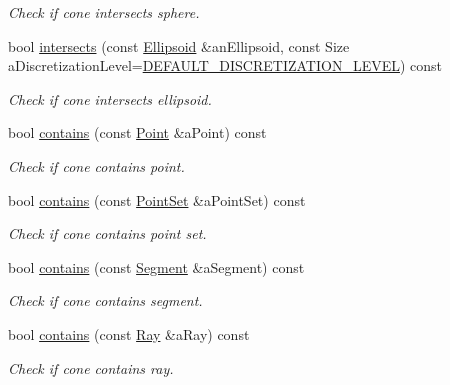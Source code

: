\begin{DoxyCompactItemize}
\begin{DoxyCompactList}\small\item\em Check if cone intersects sphere. \end{DoxyCompactList}\item 
bool \hyperlink{classostk_1_1math_1_1geom_1_1d3_1_1objects_1_1_cone_a18180f9cf2ee2ec6ef37b478c16a55b4}{intersects} (const \hyperlink{classostk_1_1math_1_1geom_1_1d3_1_1objects_1_1_ellipsoid}{Ellipsoid} \&an\+Ellipsoid, const Size a\+Discretization\+Level=\hyperlink{_pyramid_8hpp_a3eb9931e85ba4c9718113211e549e91d}{D\+E\+F\+A\+U\+L\+T\+\_\+\+D\+I\+S\+C\+R\+E\+T\+I\+Z\+A\+T\+I\+O\+N\+\_\+\+L\+E\+V\+EL}) const
\begin{DoxyCompactList}\small\item\em Check if cone intersects ellipsoid. \end{DoxyCompactList}\item 
bool \hyperlink{classostk_1_1math_1_1geom_1_1d3_1_1objects_1_1_cone_a97717dcecc3db77e980644be84485aba}{contains} (const \hyperlink{classostk_1_1math_1_1geom_1_1d3_1_1objects_1_1_point}{Point} \&a\+Point) const
\begin{DoxyCompactList}\small\item\em Check if cone contains point. \end{DoxyCompactList}\item 
bool \hyperlink{classostk_1_1math_1_1geom_1_1d3_1_1objects_1_1_cone_a53bb7e13d8605a4eadee965c04ee9686}{contains} (const \hyperlink{classostk_1_1math_1_1geom_1_1d3_1_1objects_1_1_point_set}{Point\+Set} \&a\+Point\+Set) const
\begin{DoxyCompactList}\small\item\em Check if cone contains point set. \end{DoxyCompactList}\item 
bool \hyperlink{classostk_1_1math_1_1geom_1_1d3_1_1objects_1_1_cone_aee26d5436e5095021948ed7d1dbd7638}{contains} (const \hyperlink{classostk_1_1math_1_1geom_1_1d3_1_1objects_1_1_segment}{Segment} \&a\+Segment) const
\begin{DoxyCompactList}\small\item\em Check if cone contains segment. \end{DoxyCompactList}\item 
bool \hyperlink{classostk_1_1math_1_1geom_1_1d3_1_1objects_1_1_cone_adc42e76b33717df0f6dbe91caea7c9de}{contains} (const \hyperlink{classostk_1_1math_1_1geom_1_1d3_1_1objects_1_1_ray}{Ray} \&a\+Ray) const
\begin{DoxyCompactList}\small\item\em Check if cone contains ray. \end{DoxyCompactList}\item 

\end{DoxyCompactItemize}
